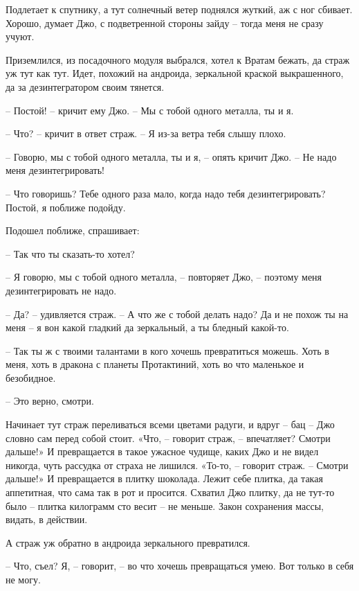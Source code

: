 \documentclass[ebook,oneside,final,openright]{memoir}
\begin{document}
\par
Подлетает к спутнику, а тут солнечный ветер поднялся жуткий, аж с ног сбивает. Хорошо, думает Джо, с подветренной стороны зайду – тогда меня не сразу учуют. \par
\par
 Приземлился, из посадочного модуля выбрался, хотел к Вратам бежать, да страж уж тут как тут. Идет, похожий на андроида, зеркальной краской выкрашенного, да за дезинтегратором своим тянется. \par
 \par
– Постой! – кричит ему Джо. – Мы с тобой одного металла, ты и я. \par
– Что? – кричит в ответ страж. – Я из-за ветра тебя слышу плохо. \par
– Говорю, мы с тобой одного металла, ты и я, – опять кричит Джо. – Не надо меня дезинтегрировать!\par
– Что говоришь? Тебе одного раза мало, когда надо тебя дезинтегрировать? Постой, я поближе подойду. \par
Подошел поближе, спрашивает: \par
– Так что ты сказать-то хотел? \par
– Я говорю, мы с тобой одного металла, – повторяет Джо, – поэтому меня дезинтегрировать не надо. \par
– Да? – удивляется страж. – А что же с тобой делать надо? Да и не похож ты на меня – я вон какой гладкий да зеркальный, а ты бледный какой-то. \par
– Так ты ж с твоими талантами в кого хочешь превратиться можешь. Хоть в меня, хоть в дракона с планеты Протактиний, хоть во что маленькое и безобидное. \par
– Это верно, смотри. \par
\par
Начинает тут страж переливаться всеми цветами радуги, и вдруг – бац – Джо словно сам перед собой стоит. «Что, – говорит страж, – впечатляет? Смотри дальше!» И превращается в такое ужасное чудище, каких Джо и не видел никогда, чуть рассудка от страха не лишился. «То-то, – говорит страж. – Смотри дальше!» И превращается в плитку шоколада. Лежит себе плитка, да такая аппетитная, что сама так в рот и просится. Схватил Джо плитку, да не тут-то было – плитка килограмм сто весит – не меньше. Закон сохранения массы, видать, в действии. \par
\par
А страж уж обратно в андроида зеркального превратился. \par
– Что, съел? Я, – говорит, – во что хочешь превращаться умею. Вот только в себя не могу. \par
\end{document}
